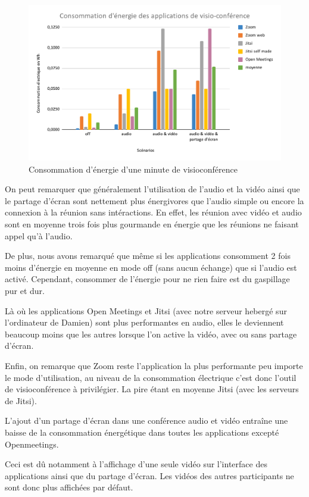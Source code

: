 \documentclass[11pt,a4paper]{report}
\begin{document}
\begin{figure}[h]
  \centering
  \includegraphics[width=1\linewidth]{graph_energie.pdf}
  \caption{Consommation d'énergie d'une minute de visioconférence}
  \label{fig:graph_energie}
\end{figure}

On peut remarquer que généralement l'utilisation de l'audio et la vidéo ainsi que le partage d'écran sont nettement plus énergivores que l'audio simple ou encore la connexion à la réunion sans intéractions. En effet, les réunion avec vidéo et audio sont en moyenne trois fois plus gourmande en énergie que les réunions ne faisant appel qu'à l'audio.

De plus, nous avons remarqué que même si les applications consomment 2 fois moins d'énergie en moyenne en mode off (sans aucun échange) que si l'audio est activé. Cependant, consommer de l'énergie pour ne rien faire est du gaspillage pur et dur.

Là où les applications Open Meetings et Jitsi (avec notre serveur hebergé sur l'ordinateur de Damien) sont plus performantes en audio, elles le deviennent beaucoup moins que les autres lorsque l'on active la vidéo, avec ou sans partage d'écran.

Enfin, on remarque  que Zoom reste l'application la plus performante peu importe le mode d'utilisation, au niveau de la consommation électrique c'est donc l'outil de visioconférence à privilégier. La pire étant en moyenne Jitsi (avec les serveurs de Jitsi).

\br L'ajout d'un partage d'écran dans une conférence audio et vidéo entraîne une baisse de la consommation énergétique dans toutes les applications excepté Openmeetings.

\noindent Ceci est dû notamment à l'affichage d'une seule vidéo sur l'interface des applications ainsi que du partage d'écran. Les vidéos des autres participants ne sont donc plus affichées par défaut.
\end{document}
